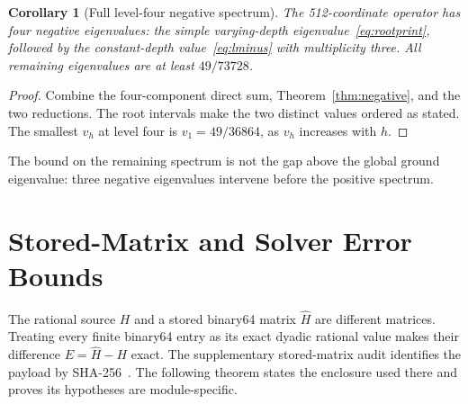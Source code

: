 \documentclass[journal,a4paper,10pt]{IEEEtran}
\newtheorem{corollary}[theorem]{Corollary}
\theoremstyle{definition}\newtheorem{definition}[theorem]{Definition}
\theoremstyle{remark}\newtheorem{remark}[theorem]{Remark}
\begin{document}
\begin{corollary}[Full level-four negative spectrum]
The 512-coordinate operator has four negative eigenvalues: the simple varying-depth eigenvalue~\eqref{eq:rootprint}, followed by the constant-depth value~\eqref{eq:lminus} with multiplicity three. All remaining eigenvalues are at least $49/73728$.
\end{corollary}
\begin{proof}
Combine the four-component direct sum, Theorem~\ref{thm:negative}, and the two reductions. The root intervals make the two distinct values ordered as stated. The smallest $v_h$ at level four is $v_1=49/36864$, as $v_h$ increases with $h$.
\end{proof}
The bound on the remaining spectrum is not the gap above the global ground eigenvalue: three negative eigenvalues intervene before the positive spectrum.

\section{Stored-Matrix and Solver Error Bounds}\label{sec:error}
The rational source $H$ and a stored binary64 matrix $\widehat H$ are different matrices. Treating every finite binary64 entry as its exact dyadic rational value makes their difference $E=\widehat H-H$ exact. The supplementary stored-matrix audit identifies the payload by SHA-256~\cite{audit}. The following theorem states the enclosure used there and proves its hypotheses are module-specific.
\end{document}
